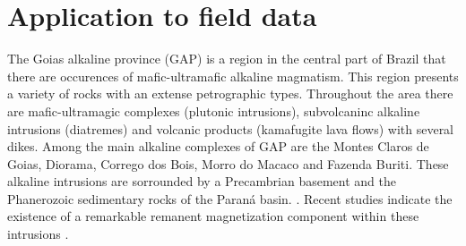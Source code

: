 \section{Application to field data}
\label{sec:real_application}

The Goias alkaline province (GAP) is a region in the central part of Brazil that there are occurences of mafic-ultramafic alkaline magmatism. This region presents a variety of rocks with an extense petrographic types. Throughout the area there are mafic-ultramagic complexes (plutonic intrusions), subvolcaninc alkaline intrusions (diatremes) and volcanic products (kamafugite lava flows) with several dikes. Among the main alkaline complexes of GAP are the Montes Claros de Goias, Diorama, Corrego dos Bois, Morro do Macaco and Fazenda Buriti. These alkaline intrusions are sorrounded by a Precambrian basement and the Phanerozoic sedimentary rocks of the Paraná basin. \citep{junqueira_brod_2005,carlson_etal_2007,marangoni_mantovani_2013,dutra_etal_2014}. Recent studies indicate the existence of a remarkable remanent magnetization component within these intrusions \citep{marangoni_mantovani_2013,oliveirajr_etal_2015,marangoni_etal_2016,zhang_etal_2018}. 

